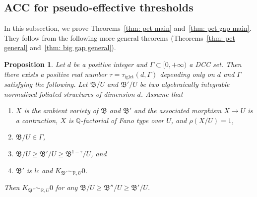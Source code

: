 \documentclass[11pt,reqno]{amsart}
\numberwithin{equation}{section}
\newcommand{\iglct}{\operatorname{iglct}}
\newcommand{\Bb}{{\mathfrak{B}}}
\newcommand{\Ii}{\Gamma}
\newtheorem{prop}[thm]{Proposition}
\theoremstyle{definition}
\begin{document}
\subsection{ACC for pseudo-effective thresholds}\label{subsec: acc pet}
In this subsection, we prove Theorems~\ref{thm: pet main} and~\ref{thm: pet gap main}. They follow from the following more general theorems (Theorems~\ref{thm: pet general} and~\ref{thm: big gap general}).


\begin{prop}\label{prop: global acc in bb}
    Let $d$ be a positive integer and $\Ii\subset [0,+\infty)$ a DCC set. Then there exists a positive real number $\tau=\tau_{\iglct}(d,\Ii)$ depending only on $d$ and $\Ii$ satisfying the following. Let $\Bb/U$ and $\Bb'/U$ be two algebraically integrable normalized foliated structures of dimension $d$. Assume that
    \begin{enumerate}
    \item $X$ is the ambient variety of $\Bb$ and $\Bb'$ and the associated morphism $X\rightarrow U$ is a contraction, $X$ is $\mathbb Q$-factorial of Fano type over $U$, and $\rho(X/U)=1$,
        \item $\Bb/U\in\Ii$,
        \item $\Bb/U\geq\Bb'/U\geq\Bb^{1-\tau}/U$, and
        \item $\Bb'$ is lc and $K_{\Bb'}\sim_{\mathbb R,U}0$.
    \end{enumerate}
    Then $K_{\Bb''}\sim_{\mathbb R,U}0$ for any $\Bb/U\geq\Bb''/U\geq\Bb'/U$.
\end{prop}
\end{document}
